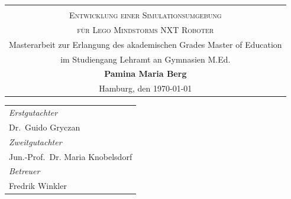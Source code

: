\begin{titlepage}
\begin{center} 
\vspace{0.5cm} 
\begin{tabular}{c}
 \vspace{1.5cm}\\
\Large \textsc{Entwicklung einer Simulationsumgebung}\\
\vspace{0.5cm}
\Large \textsc{für Lego Mindstorms NXT Roboter}\\
\small Masterarbeit zur Erlangung des akademischen Grades Master of Education\\
\vspace{1.25cm}
\small im Studiengang Lehramt an Gymnasien M.Ed.\\
\vspace{1.25cm}
\large \textbf{Pamina Maria Berg}\\
\normalsize Hamburg, den \today
\end{tabular}
\par 
\end{center}
\par
\vspace*{3cm}
\begin{tabular}{l}
\emph{Erstgutachter}\\
Dr.\, Guido Gryczan\\
\emph{Zweitgutachter}\\
Jun.-Prof.\, Dr. Maria Knobelsdorf\\
\emph{Betreuer}\\
Fredrik Winkler\\
\end{tabular}

\end{titlepage}
